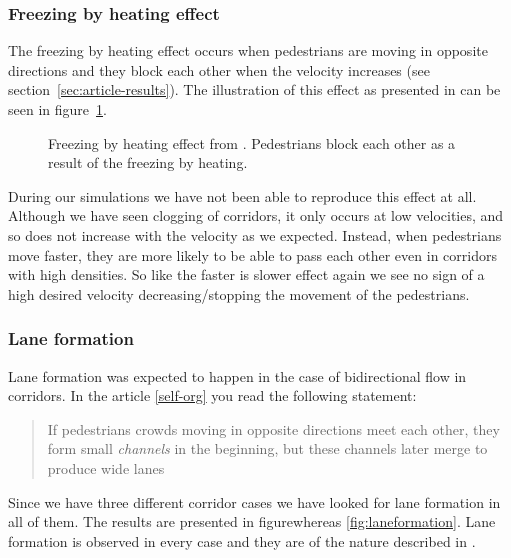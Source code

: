 \subsubsection{Freezing by heating effect}
The freezing by heating effect occurs when pedestrians are moving in opposite 
directions and they block each other when the velocity increases (see 
section~\ref{sec:article-results}). The illustration of this effect as 
presented in \cite{oscil} can be seen in 
figure~\ref{fig:freezing_by_heating_litterature}.

\begin{figure}[h]
    \centering
    \caption[Freezing by heating effect from \cite{oscil}]{Freezing by heating 
    effect from \cite{oscil}. Pedestrians block each other as a result of the 
    freezing by heating.}
    \label{fig:freezing_by_heating_litterature}
\end{figure}

During our simulations we have not been able to reproduce this effect at all.  
Although we have seen clogging of corridors, it only occurs at low velocities, 
and so does not increase with the velocity as we expected. Instead, when 
pedestrians move faster, they are more likely to be able to pass each other 
even in corridors with high densities. So like the faster is slower
effect again we see no sign of a high desired velocity decreasing/stopping
the movement of the pedestrians.

\subsubsection{Lane formation}
Lane formation was expected to happen in the case of bidirectional
flow in corridors. In the article \ref{self-org} you read the following
statement:

\begin{quote}
If pedestrians crowds moving in opposite directions meet each other,
they form small \emph{channels} in the beginning, but these channels
later merge to produce wide lanes
\end{quote}

Since we have three different corridor cases we have looked for lane
formation in all of them. The results are presented in figurewhereas
\ref{fig:laneformation}. Lane formation is observed in every case
and they are of the nature described in \cite{self-org}.\\

